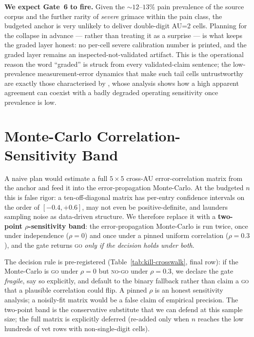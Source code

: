 \textbf{We expect Gate~6 to fire.} Given the ${\sim}12$--$13\%$ pain prevalence of
the source corpus and the further rarity of \emph{severe} grimace within the pain
class, the budgeted anchor is very unlikely to deliver double-digit AU=2 cells.
Planning for the collapse in advance --- rather than treating it as a surprise ---
is what keeps the graded layer honest: no per-cell severe calibration number is
printed, and the graded layer remains an inspected-not-validated artifact. This is
the operational reason the word ``graded'' is struck from every validated-claim
sentence; the low-prevalence measurement-error dynamics that make such tail cells
untrustworthy are exactly those characterised by \citet{chavoshi2025}, whose
analysis shows how a high apparent agreement can coexist with a badly degraded
operating sensitivity once prevalence is low.

\section{Monte-Carlo Correlation-Sensitivity Band}
\label{sec:rho-band}

A naive plan would estimate a full $5\times5$ cross-AU error-correlation matrix
from the anchor and feed it into the error-propagation Monte-Carlo. At the
budgeted $n$ this is false rigor: a ten-off-diagonal matrix has per-entry
confidence intervals on the order of $[-0.4, +0.6]$, may not even be
positive-definite, and launders sampling noise as data-driven structure. We
therefore replace it with a \textbf{two-point $\rho$-sensitivity band}: the
error-propagation Monte-Carlo is run twice, once under independence ($\rho = 0$)
and once under a pinned uniform correlation ($\rho = 0.3$), and the gate returns
\textsc{go} \emph{only if the decision holds under both}.

The decision rule is pre-registered (Table~\ref{tab:kill-crosswalk}, final row):
if the Monte-Carlo is \textsc{go} under $\rho = 0$ but \textsc{no-go} under
$\rho = 0.3$, we declare the gate \emph{fragile}, say so explicitly, and default to
the binary fallback rather than claim a \textsc{go} that a plausible correlation
could flip. A pinned $\rho$ is an honest sensitivity analysis; a noisily-fit
matrix would be a false claim of empirical precision. The two-point band is the
conservative substitute that we can defend at this sample size; the full matrix is
explicitly deferred (re-added only when $n$ reaches the low hundreds of vet rows
with non-single-digit cells).

